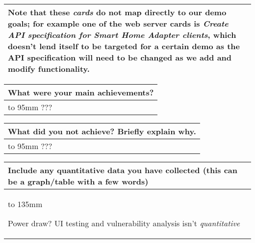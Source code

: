 \documentclass[a4paper]{article}
\newcommand{\colWidth}{141mm}
\begin{document}
\begin{center}
\begin{tabular}{|p{\colWidth}|}
		\vspace{3mm}

		Note that these \textit{cards} do not map directly to our demo goals; for example one of the web server cards is \textit{Create API specification for Smart Home Adapter clients},
		which doesn't lend itself to be targeted for a certain demo as the API specification will need to be changed as we add and modify functionality.
	
  \\
  \hline
\end{tabular}
\vskip 5mm


\begin{tabular}{|p{\colWidth}|}
	\hline
	\cellcolor{blue!25}\large
	\textbf{What were your main achievements?}
	\\ \hline
	\vtop to 95mm{
		\color{red} ???
	}
  \\
  \hline
\end{tabular}
\vskip 5mm


\begin{tabular}{|p{\colWidth}|}
	\hline
	\cellcolor{blue!25}\large
	\textbf{What did you not achieve? Briefly explain why.}
	\\ \hline
	\vtop to 95mm{
		\color{red} ???
  }
  \\
  \hline
\end{tabular}
\vskip 5mm


\begin{tabular}{|p{\colWidth}|}
	\hline
	\cellcolor{blue!25}\large
	\textbf{Include any quantitative data you have collected (this can be a graph/table with a few words)}
	\\ \hline
	\vtop to 135mm{
		\color{red} Power draw? UI testing and vulnerability analysis isn't \textit{quantitative}

  }
  \\
  \hline
\end{tabular}
\vskip 5mm



\end{center}
\end{document}
